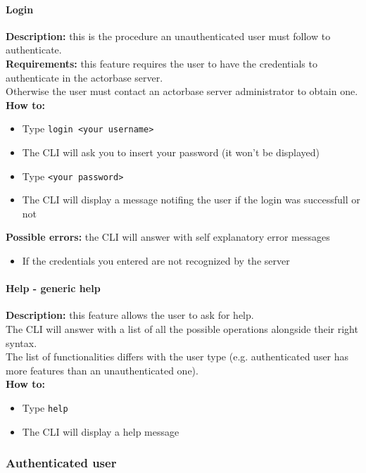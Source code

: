 \documentclass{scalatekids-article}
\begin{document}
\paragraph{Login}

\textbf{Description:} this is the procedure an unauthenticated user must follow to authenticate.\\
\textbf{Requirements:} this feature requires the user to have the credentials 
to authenticate in the actorbase server.\\
Otherwise the user must contact an actorbase server 
administrator to obtain one.\\
\textbf{How to:} 
\begin{itemize}
	\item Type \texttt{login <your username>}
	\item The CLI will ask you to insert your password (it won't be	displayed)
	\item Type \texttt{<your password>} 
	\item The CLI will display a message notifing the user if the login was successfull or not
\end{itemize}
\textbf{Possible errors:} the CLI will answer with self explanatory error messages
\begin{itemize}
	\item If the credentials you entered are not recognized by the server
\end{itemize}

\paragraph{Help - generic help}
\label{sec:generichelp}
\textbf{Description:} this feature allows the user to ask for help.\\
The CLI will answer with a list of all the possible operations alongside
their right syntax.\\
The list of functionalities differs with the user type (e.g. authenticated user has more features than an unauthenticated one).\\
\textbf{How to:} 
\begin{itemize}
	\item Type \texttt{help} 
	\item The CLI will display a help message
\end{itemize}

\subsubsection{Authenticated user}
\label{sec:authenticateduser}
\end{document}
